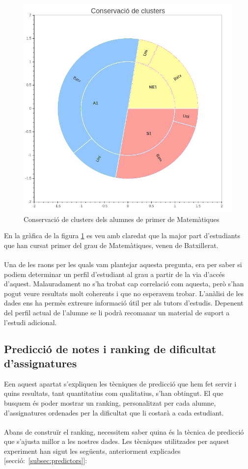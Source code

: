 \documentclass[12pt,a4paper,catalan]{article}
\begin{document}
\newpage

\begin{figure}[h]
\centering
\includegraphics[width=.6\linewidth]{img/conservacio_clusters_primer_mates.png}
\caption{Conservació de clusters dels alumnes de primer de Matemàtiques}
\label{fig:ccm1}
\end{figure}

En la gràfica de la figura \ref{fig:ccm1} es veu amb claredat que la major part d'estudiants que han cursat primer del grau de Matemàtiques, venen de Batxillerat. 
\\
\\
Una de les raons per les quals vam plantejar aquesta pregunta, era per saber si podiem determinar un perfil d'estudiant al grau a partir de la via d'accés d'aquest. Malauradament no s'ha trobat cap correlació com aquesta, però s'han pogut veure resultats molt coherents i que no esperavem trobar.  L'anàlisi de les dades ens ha permès extreure informació útil per als tutors d'estudis. Depenent del perfil actual de l'alumne se li podrà recomanar un material de suport a l'estudi adicional.

\newpage

\subsection{Predicció de notes i ranking de dificultat d'assignatures}
Een aquest apartat s'expliquen  les tècniques de predicció que hem fet servir i quins resultats, tant quantitatius com qualitatius, s'han obtingut. El que busquem és poder mostrar un ranking, personalitzat per cada alumne, d'assignatures ordenades per la dificultat que li costarà a cada estudiant.
\\
\\
Abans de construïr el ranking, necessitem saber quina és la tècnica de predicció que s'ajusta millor a les nostres dades. Les tècniques utilitzades per aquest experiment han sigut les següents, anteriorment explicades [secció:~\ref{subsec:predictors}]:
\end{document}
